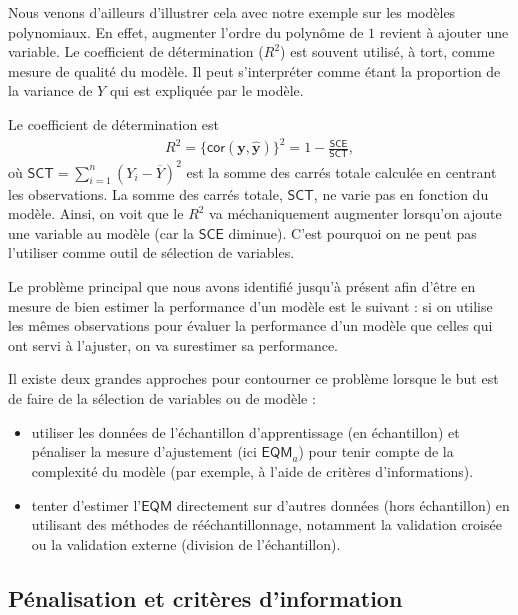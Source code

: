 \documentclass[
  11pt,
  letterpaper,
]{scrbook}
\providecommand{\tightlist}{%
  \setlength{\itemsep}{0pt}\setlength{\parskip}{0pt}}\usepackage{longtable,booktabs,array}
\theoremstyle{definition}
\theoremstyle{remark}
\begin{document}
Nous venons d'ailleurs d'illustrer cela avec notre exemple sur les
modèles polynomiaux. En effet, augmenter l'ordre du polynôme de \(1\)
revient à ajouter une variable. Le coefficient de détermination
(\(R^2\)) est souvent utilisé, à tort, comme mesure de qualité du
modèle. Il peut s'interpréter comme étant la proportion de la variance
de \(Y\) qui est expliquée par le modèle.

Le coefficient de détermination est \begin{align*}
R^2=\{\mathsf{cor}(\boldsymbol{y}, \widehat{\boldsymbol{y}})\}^2 = 1-\frac{\mathsf{SCE}}{\mathsf{SCT}},
\end{align*} où \(\mathsf{SCT}=\sum_{i=1}^n (Y_i-\overline{Y})^2\) est
la somme des carrés totale calculée en centrant les observations. La
somme des carrés totale, \(\mathsf{SCT}\), ne varie pas en fonction du
modèle. Ainsi, on voit que le \(R^2\) va méchaniquement augmenter
lorsqu'on ajoute une variable au modèle (car la \(\mathsf{SCE}\)
diminue). C'est pourquoi on ne peut pas l'utiliser comme outil de
sélection de variables.

Le problème principal que nous avons identifié jusqu'à présent afin
d'être en mesure de bien estimer la performance d'un modèle est le
suivant : si on utilise les mêmes observations pour évaluer la
performance d'un modèle que celles qui ont servi à l'ajuster, on va
surestimer sa performance.

Il existe deux grandes approches pour contourner ce problème lorsque le
but est de faire de la sélection de variables ou de modèle :

\begin{itemize}
\tightlist
\item
  utiliser les données de l'échantillon d'apprentissage (en échantillon)
  et pénaliser la mesure d'ajustement (ici \(\widehat{\mathsf{EQM}}_a\))
  pour tenir compte de la complexité du modèle (par exemple, à l'aide de
  critères d'informations).
\item
  tenter d'estimer l'\(\mathsf{EQM}\) directement sur d'autres données
  (hors échantillon) en utilisant des méthodes de rééchantillonnage,
  notamment la validation croisée ou la validation externe (division de
  l'échantillon).
\end{itemize}

\hypertarget{puxe9nalisation-et-crituxe8res-dinformation}{%
\subsection{Pénalisation et critères
d'information}\label{puxe9nalisation-et-crituxe8res-dinformation}}
\end{document}
